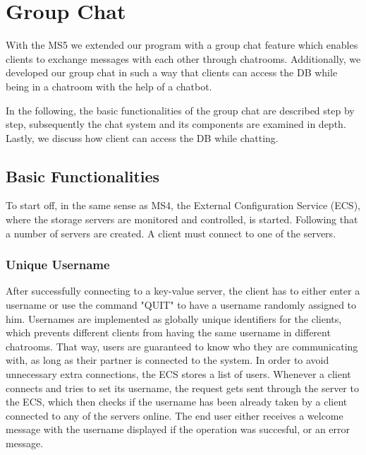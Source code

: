 \section{Group Chat}
\label{sec:groupchat}
With the MS5 we extended our program with a group chat feature which enables clients to exchange messages with each other through chatrooms. Additionally, we developed our group chat in such a way that clients can access the DB while being in a chatroom with the help of a chatbot.
 
In the following, the basic functionalities of the group chat are described step by step, subsequently the chat system and its components are examined in depth. Lastly, we discuss how client can access the DB while chatting.

\subsection{Basic Functionalities}
\label{sec:groupchat_functionalities}
To start off, in the same sense as MS4, the External Configuration Service (ECS), where the storage servers are monitored and controlled, is started. Following that a number of servers are created. A client must connect to one of the servers.

\subsubsection{Unique Username}
\label{sec:groupchat_funtionalities_uniqueusername}
After successfully connecting to a key-value server, the client has to either enter a username or use the command "QUIT" to have a username randomly assigned to him. Usernames are implemented as globally unique identifiers for the clients, which prevents different clients from having the same username in different chatrooms. That way, users are guaranteed to know who they are communicating with, as long as their partner is connected to the system.
In order to avoid unnecessary extra connections, the ECS stores a list of users. Whenever a client connects and tries to set its username, the request gets sent through the server to the ECS, which then checks if the username has been already taken by a client connected to any of the servers online. The end user either receives a welcome message with the username displayed if the operation was succesful, or an error message.
 
